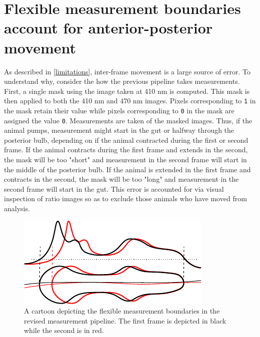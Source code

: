 \section{Flexible measurement boundaries account for anterior-posterior movement} \label{channelSegmentation}

As described in \ref{limitations}, inter-frame movement is a large source of error. To understand why, consider the how the previous pipeline takes measurements. First, a single mask using the image taken at 410 nm is computed. This mask is then applied to both the 410 nm and 470 nm images. Pixels corresponding to \texttt{1} in the mask retain their value while pixels corresponding to \texttt{0} in the mask are assigned the value \texttt{0}. Measurements are taken of the masked images. Thus, if the animal pumps, measurement might start in the gut or halfway through the posterior bulb, depending on if the animal contracted during the first or second frame. If the animal contracts during the first frame and extends in the second, the mask will be too "short" and measurement in the second frame will start in the middle of the posterior bulb. If the animal is extended in the first frame and contracts in the second, the mask will be too "long" and measurement in the second frame will start in the gut. This error is accounted for via visual inspection of ratio images so as to exclude those animals who have moved from analysis.

\begin{figure}[ht]
    \centering
    \includegraphics[scale=1.20]{Figures/rendered_files/new_boundaries_cartoon}
    \decoRule
    \caption[Flexible measurement boundaries]{A cartoon depicting the flexible measurement boundaries in the revised measurement pipeline. The first frame is depicted in black while the second is in red.}
    \label{fig:NewBoundariesCartoon}
\end{figure}

